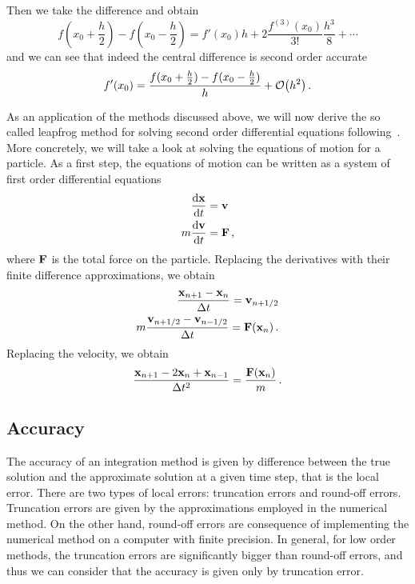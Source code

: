 \documentclass[12pt, class=report, crop=false]{standalone}
\begin{document}
Then we take the difference and obtain
\[
  f(x_0+\frac{h}{2}) - f(x_0-\frac{h}{2}) = f'(x_0)h
    + 2\frac{f^{(3)}(x_0)}{3!}\frac{h^3}{8} + \dotsb
\]
and we can see that indeed the central difference is second order accurate
\[
  f'(x_0) = \frac{f(x_0+\frac{h}{2}) - f(x_0-\frac{h}{2})}{h} + \order{h^2}\,.
\]

As an application of the methods discussed above, we will now derive the so called
leapfrog method for solving second order differential equations
following~\textcite[Chapter~4]{hockney_computersimulation_1988}. More concretely,
we will take a look at solving the equations of motion for a particle. As a first
step, the equations of motion can be written as a system of first order differential
equations
\begin{align*}
  \dv{\vb{x}}{t} &= \vb{v} \\
  m \dv{\vb{v}}{t} &= \vb{F}\,,
\end{align*}
where \(\vb{F}\) is the total force on the particle. Replacing the derivatives
with their finite difference approximations, we obtain
\begin{subequations}
  \begin{align}
    \label{eq:leapfrog}
    \frac{\vb{x}_{n+1} - \vb{x}_n}{\Delta t} = \vb{v}_{n+1/2} \\
    m \frac{\vb{v}_{n+1/2} - \vb{v}_{n-1/2}}{\Delta t} = \vb{F}(\vb{x}_n)\,.
  \end{align}
\end{subequations}
Replacing the velocity, we obtain
\begin{equation*}
  \frac{\vb{x}_{n+1}-2\vb{x}_n+\vb{x}_{n-1}}{\Delta t^2} = \frac{\vb{F}(\vb{x}_n)}{m}\,.
\end{equation*}

\subsection{Accuracy}

The accuracy of an integration method is given by difference between the true
solution and the approximate solution at a given time step, that is the local
error. There are two types of local errors: truncation errors and round-off errors.
Truncation errors are given by the approximations employed in the numerical method.
On the other hand, round-off errors are consequence of implementing the numerical
method on a computer with finite precision. In general, for low order methods,
the truncation errors are significantly bigger than round-off errors, and thus
we can consider that the accuracy is given only by truncation error.
\end{document}
